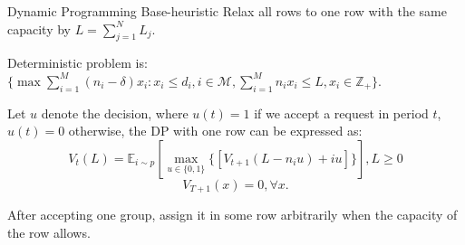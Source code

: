       \begin{frame}{Dynamic Programming Base-heuristic}
        Relax all rows to one row with the same capacity by $L = \sum_{j=1}^{N} L_j$.
        
        Deterministic problem is: $\{\max \sum_{i=1}^{M} (n_i- \delta) x_{i}: x_{i} \leq d_{i}, i \in \mathcal{M}, \sum_{i=1}^{M} n_{i} x_{i} \leq L, x_{i} \in \mathbb{Z}_{+}\}$.
        
        Let $u$ denote the decision, where $u(t) = 1$ if we accept a request in period $t$, $u(t) =0$ otherwise, the DP with one row can be expressed as:
        $$V_{t}(L) = \mathbb{E}_{i \sim p} [\max_{u \in \{0,1\}} \{ {[V_{t+1}(L-n_i u)+ i u]}\}], L \geq 0$$ 
        $$V_{T+1}(x) =0, \forall x.$$

        After accepting one group, assign it in some row arbitrarily when the capacity of the row allows.
      \end{frame}
      